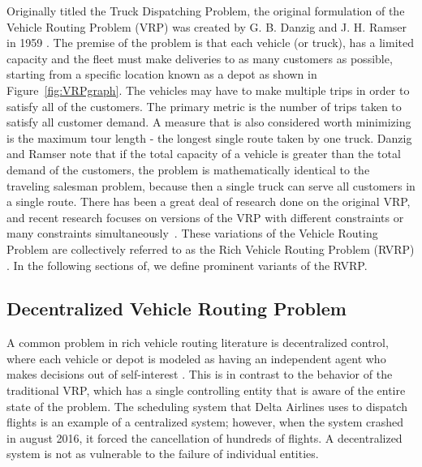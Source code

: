 \documentclass{sig-alternate}
\begin{document}
Originally titled the Truck Dispatching Problem, the original formulation of the Vehicle Routing Problem (VRP) was created by G. B. Danzig and J. H. Ramser in 1959 \cite{Danzig:1959}. The premise of the problem is that each vehicle (or truck), has a limited capacity and the fleet must make deliveries to as many customers as possible, starting from a specific location known as a depot as shown in Figure~\ref{fig:VRPgraph}. The vehicles may have to make multiple trips in order to satisfy all of the customers. The primary metric is the number of trips taken to satisfy all customer demand. A measure that is also considered worth minimizing is the maximum tour length - the longest single route taken by one truck. Danzig and Ramser note that if the total capacity of a vehicle is greater than the total demand of the customers, the problem is mathematically identical to the traveling salesman problem, because then a single truck can serve all customers in a single route. There has been a great deal of research done on the original VRP, and recent research focuses on versions of the VRP with different constraints or many constraints simultaneously~\cite{Caceres-Cruz:2014}. These variations of the Vehicle Routing Problem are collectively referred to as the Rich Vehicle Routing Problem (RVRP) . In the following sections of, we define prominent variants of the RVRP.
\subsection{Decentralized Vehicle Routing Problem}
A common problem in rich vehicle routing literature is decentralized control, where each vehicle or depot is modeled as having an independent agent who makes decisions out of self-interest \cite{Caceres-Cruz:2014}. This is in contrast to the behavior of the traditional VRP, which has a single controlling entity that is aware of the entire state of the problem. The scheduling system that Delta Airlines uses to dispatch flights is an example of a centralized system; however, when the system crashed in august 2016, it forced the cancellation of hundreds of flights. A decentralized system is not as vulnerable to the failure of individual entities.
\end{document}
